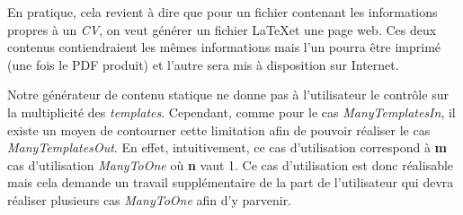 			\begin{exmpl}
				\label{exmpl:ManyTemplatesOut}
				En pratique, cela revient à dire que pour un fichier contenant les informations propres à un \textit{CV}, on veut générer un fichier \LaTeX et une page web. Ces deux contenus contiendraient les mêmes informations mais l'un pourra être imprimé (une fois le PDF produit) et l'autre sera mis à disposition sur Internet.
			\end{exmpl}
			
			\begin{note}
				Notre générateur de contenu statique ne donne pas à l'utilisateur le contrôle sur la multiplicité des \textit{templates}. Cependant, comme pour le cas \textit{ManyTemplatesIn}, il existe un moyen de contourner cette limitation afin de pouvoir réaliser le cas \textit{ManyTemplatesOut}. En effet, intuitivement, ce cas d'utilisation correspond à \textbf{m} cas d'utilisation \textit{ManyToOne} où \textbf{n} vaut 1. Ce cas d'utilisation est donc réalisable mais cela demande un travail supplémentaire de la part de l'utilisateur qui devra réaliser plusieurs cas \textit{ManyToOne} afin d'y parvenir.
			\end{note}
			
				
	